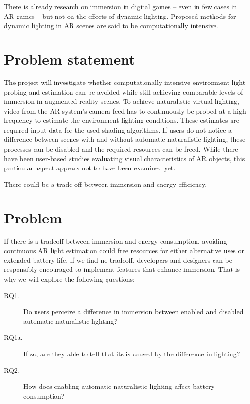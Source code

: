 \documentclass[12pt,twoside,english]{article}
\begin{document}
There is already research on immersion in digital games -- even in few cases in AR games -- but not on the effects of dynamic lighting.
Proposed methods for dynamic lighting in AR scenes are said to be computationally intensive.

\section{Problem statement}
\label{sect:problem_statement}

The project will investigate whether computationally intensive environment light probing and estimation can be avoided while still achieving comparable levels of immersion in augmented reality scenes.
To achieve naturalistic virtual lighting, video from the AR system's camera feed has to continuously be probed at a high frequency to estimate the environment lighting conditions.
These estimates are required input data for the used shading algorithms.
If users do not notice a difference between scenes with and without automatic naturalistic lighting, these processes can be disabled and the required resources can be freed.
While there have been user-based studies evaluating visual characteristics of \gls{AR} objects, this particular aspect appears not to have been examined yet.

There could be a trade-off between immersion and energy efficiency.

\section{Problem}
\label{sect:problem}

If there is a tradeoff between immersion and energy consumption, avoiding continuous \gls{AR} light estimation could free resources for either alternative uses or extended battery life.
If we find no tradeoff, developers and designers can be responsibly encouraged to implement features that enhance immersion.
That is why we will explore the following questions:

\begin{description}
    \item[RQ1.] Do users perceive a difference in immersion between enabled and disabled automatic naturalistic lighting?
    \item[RQ1a.] If so, are they able to tell that its is caused by the difference in lighting?
    \item[RQ2.] How does enabling automatic naturalistic lighting affect battery consumption?
\end{description}
\end{document}
